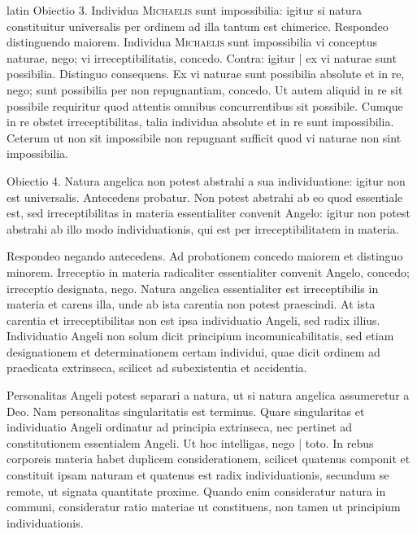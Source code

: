 \begin{otherlanguage*}{latin}
\pstart
Obiectio 3. Individua \textsc{Michaelis}\index[persons]{} sunt impossibilia:
igitur si natura constituitur universalis per ordinem ad illa tantum est chimerice. Respondeo distinguendo maiorem. Individua \textsc{Michaelis}\index[persons]{} sunt impossibilia vi conceptus naturae, nego; vi irreceptibilitatis, concedo. Contra:
igitur \textnormal{|} ex vi naturae sunt possibilia. Distinguo consequens. Ex vi naturae sunt possibilia absolute et in re, nego; sunt possibilia per non repugnantiam, concedo. Ut autem aliquid in re sit possibile requiritur quod attentis omnibus concurrentibus sit possibile. Cumque in re obstet irreceptibilitas, talia individua absolute et in re sunt impossibilia. Ceterum ut non sit impossibile non repugnant sufficit quod vi naturae non sint impossibilia. 
\pend

\pstart
Obiectio 4. Natura angelica non potest abstrahi a sua individuatione:
igitur non est universalis. Antecedens probatur. Non potest abstrahi ab eo quod essentiale est, sed irreceptibilitas in materia essentialiter convenit Angelo:
igitur non potest abstrahi ab illo modo individuationis, qui est per irreceptibilitatem in materia. 
\pend

\pstart
Respondeo negando antecedens. Ad probationem concedo maiorem et distinguo minorem. Irreceptio in materia radicaliter essentialiter convenit Angelo, concedo; irreceptio designata, nego. Natura angelica essentialiter est irreceptibilis in materia et carens illa, unde ab ista carentia non potest praescindi. At ista carentia et irreceptibilitas non est ipsa individuatio Angeli, sed radix illius. Individuatio Angeli non solum dicit principium incomunicabilitatis, sed etiam designationem et determinationem certam individui, quae dicit ordinem ad praedicata extrinseca, scilicet ad subexistentia et accidentia. 
\pend

\pstart
Personalitas Angeli potest separari a natura, ut si natura angelica assumeretur a Deo. Nam personalitas singularitatis est terminus. Quare singularitas et individuatio Angeli ordinatur ad principia extrinseca, nec pertinet ad constitutionem essentialem Angeli. Ut hoc intelligas, nego \textnormal{|} toto. In rebus corporeis materia habet duplicem considerationem, scilicet quatenus componit et constituit ipsam naturam et quatenus est radix individuationis, secundum se remote, ut signata quantitate proxime. Quando enim consideratur natura in communi, consideratur ratio materiae ut constituens, non tamen ut principium individuationis. 
\pend


\end{otherlanguage*}
